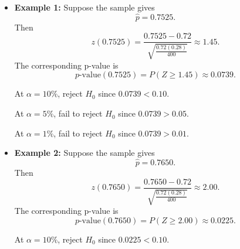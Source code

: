\begin{itemize}
	\item \textbf{Example 1:} Suppose the sample gives
	\[
	\hat p=0.7525.
	\]
	Then
	\[
	z(0.7525)=\frac{0.7525-0.72}{\sqrt{\frac{0.72(0.28)}{400}}}
	\approx 1.45.
	\]
	The corresponding p-value is
	\[
	p\text{-value}(0.7525)=P(Z\ge1.45)\approx 0.0739.
	\]
	
	At \(\alpha=10\%\), reject \(H_0\) since \(0.0739<0.10\).
	
	\begin{center}
	\end{center}
	
	
	At \(\alpha=5\%\), fail to reject \(H_0\) since \(0.0739>0.05\).
	
	\begin{center}
	\end{center}
	
	
	At \(\alpha=1\%\), fail to reject \(H_0\) since \(0.0739>0.01\).
	
	\begin{center}
	\end{center}
	
	
	\item \textbf{Example 2:} Suppose the sample gives
	\[
	\hat p=0.7650.
	\]
	Then
	\[
	z(0.7650)=\frac{0.7650-0.72}{\sqrt{\frac{0.72(0.28)}{400}}}
	\approx 2.00.
	\]
	The corresponding p-value is
	\[
	p\text{-value}(0.7650)=P(Z\ge2.00)\approx 0.0225.
	\]
	
	At \(\alpha=10\%\), reject \(H_0\) since \(0.0225<0.10\).
	
	\begin{center}
	\end{center}
	
	

\end{itemize}
